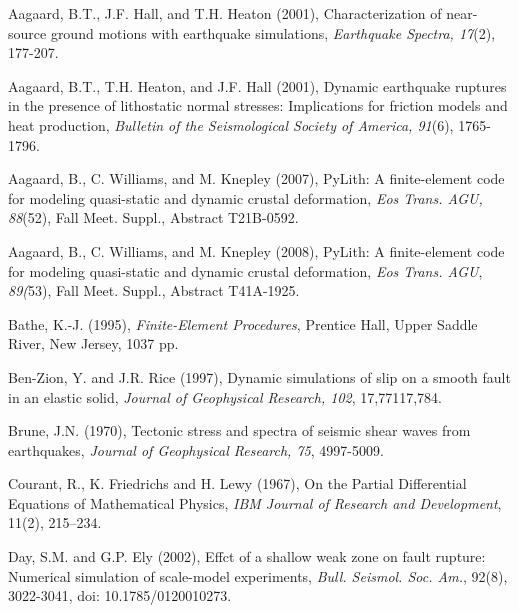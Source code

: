 \begin{thebibliography}{Bibliography}
  
Aagaard, B.T.,
  J.F. Hall, and T.H. Heaton (2001), Characterization of near-source
  ground motions with earthquake simulations, \emph{Earthquake
    Spectra, 17}(2), 177-207.

Aagaard, B.T.,
  T.H. Heaton, and J.F. Hall (2001), Dynamic earthquake ruptures in
  the presence of lithostatic normal stresses: Implications for
  friction models and heat production, \emph{Bulletin of the
    Seismological Society of America, 91}(6), 1765-1796.

Aagaard, B., C.
  Williams, and M. Knepley (2007), PyLith: A finite-element code for
  modeling quasi-static and dynamic crustal deformation, \emph{Eos
    Trans.  AGU, 88}(52), Fall Meet. Suppl., Abstract T21B-0592.

Aagaard, B., C.
  Williams, and M. Knepley (2008), PyLith: A finite-element code for
  modeling quasi-static and dynamic crustal deformation, \emph{Eos
    Trans.  AGU}, \emph{89(}53), Fall Meet. Suppl., Abstract
  T41A-1925.

Bathe, K.-J. (1995),
  \textit{Finite-Element Procedures}, Prentice Hall, Upper Saddle
  River, New Jersey, 1037 pp.

Ben-Zion, Y.  and
  J.R. Rice (1997), Dynamic simulations of slip on a smooth fault in
  an elastic solid, \emph{Journal of Geophysical Research}\textit{,
    102}, 17,771\textendash{}17,784.

Brune, J.N. (1970), Tectonic stress
  and spectra of seismic shear waves from earthquakes, \emph{Journal
    of Geophysical Research, 75}, 4997-5009.

Courant, R., K.
  Friedrichs and H. Lewy (1967), On the Partial Differential Equations
  of Mathematical Physics, \textit{IBM Journal of Research and
    Development}, 11(2), 215--234.

Day, S.M. and G.P. Ely
  (2002), Effct of a shallow weak zone on fault rupture: Numerical
  simulation of scale-model experiments,
  \textit{Bull. Seismol. Soc. Am.}, 92(8), 3022-3041, doi:
  10.1785/0120010273.


\end{thebibliography}
